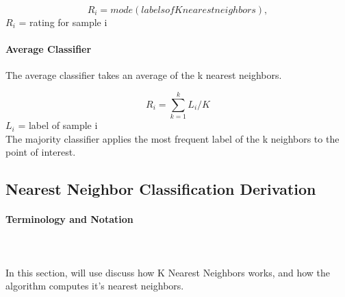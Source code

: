 \documentclass{report}
\begin{document}
\begin{equation}
R_i = mode(labels of K nearest neighbors),  
\end{equation}
$R_i$ = rating for sample i

\paragraph{Average Classifier}

The average classifier takes an average of the k nearest neighbors.

\begin{equation}
R_i = \sum_{k=1}^k L_i / K
\end{equation}
$L_i$ = label of sample i
\\
The majority classifier applies the most frequent label of the k neighbors to the point of interest. 

\subsection*{Nearest Neighbor Classification Derivation}

\paragraph*{Terminology and Notation }\cite{4}
\\ \\
In this section, will use discuss how K Nearest Neighbors works, and how the algorithm computes it's nearest neighbors.
\end{document}
